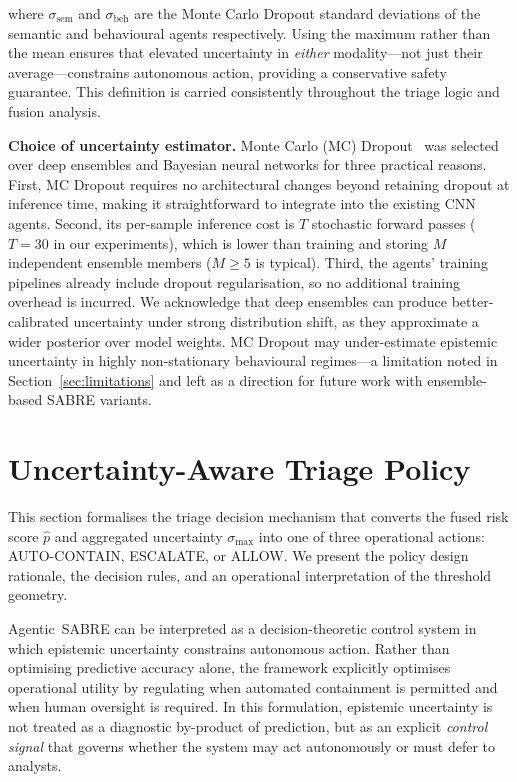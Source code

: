 \documentclass[lettersize,journal]{IEEEtran}
\begin{document}
where $\sigma_{\text{sem}}$ and $\sigma_{\text{beh}}$ are the Monte Carlo Dropout standard
deviations of the semantic and behavioural agents respectively. Using the maximum rather than
the mean ensures that elevated uncertainty in \emph{either} modality---not just their
average---constrains autonomous action, providing a conservative safety guarantee.
This definition is carried consistently throughout the triage logic and fusion analysis.

\noindent\textbf{Choice of uncertainty estimator.}
Monte Carlo (MC) Dropout~\cite{gal2016dropout} was selected over deep ensembles and Bayesian
neural networks for three practical reasons. First, MC Dropout requires no architectural
changes beyond retaining dropout at inference time, making it straightforward to integrate
into the existing CNN agents. Second, its per-sample inference cost is $T$ stochastic forward
passes ($T = 30$ in our experiments), which is lower than training and storing $M$ independent
ensemble members ($M \ge 5$ is typical). Third, the agents' training pipelines already include
dropout regularisation, so no additional training overhead is incurred. We acknowledge that
deep ensembles can produce better-calibrated uncertainty under strong distribution shift,
as they approximate a wider posterior over model weights. MC Dropout may under-estimate
epistemic uncertainty in highly non-stationary behavioural regimes---a limitation noted in
Section~\ref{sec:limitations} and left as a direction for future work with ensemble-based
SABRE variants.


\section{Uncertainty-Aware Triage Policy}
\label{sec:uncert_policy}

This section formalises the triage decision mechanism that converts the fused risk score
$\hat{p}$ and aggregated uncertainty $\sigma_{\max}$ into one of three operational actions:
\textsc{AUTO-CONTAIN}, \textsc{ESCALATE}, or \textsc{ALLOW}. We present the policy design
rationale, the decision rules, and an operational interpretation of the threshold geometry.

Agentic~SABRE can be interpreted as a decision-theoretic control system in which
epistemic uncertainty constrains autonomous action. Rather than optimising
predictive accuracy alone, the framework explicitly optimises operational utility
by regulating when automated containment is permitted and when human oversight
is required. In this formulation, epistemic uncertainty is not treated as a
diagnostic by-product of prediction, but as an explicit \emph{control signal}
that governs whether the system may act autonomously or must defer to analysts.
\end{document}
